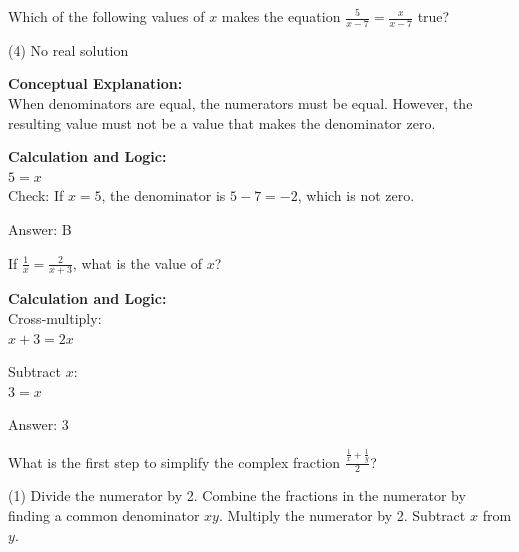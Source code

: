 \documentclass[11pt,paper=a4,answers]{exam}
\begin{document}
\begin{questions}
\vspace{40pt}

\question
Which of the following values of $x$ makes the equation $\frac{5}{x-7} = \frac{x}{x-7}$ true?
\begin{tasks}(4)
    \task No real solution
\end{tasks}

\begin{solution}
\textbf{Conceptual Explanation:} \\
When denominators are equal, the numerators must be equal. However, the resulting value must not be a value that makes the denominator zero.

\vspace{20pt}

\textbf{Calculation and Logic:} \\
$5 = x$ \\
Check: If $x=5$, the denominator is $5-7=-2$, which is not zero.

\vspace{25pt}

Answer: \colorbox{yellow!100}{B}
\end{solution}

\vspace{40pt}

\question
If $\frac{1}{x} = \frac{2}{x+3}$, what is the value of $x$?

\begin{solution}
\textbf{Calculation and Logic:} \\
Cross-multiply: \\
$x + 3 = 2x$

\vspace{10pt}

Subtract $x$: \\
$3 = x$

\vspace{25pt}

Answer: \colorbox{yellow!100}{3}
\end{solution}

\vspace{40pt}

\question
What is the first step to simplify the complex fraction $\frac{\frac{1}{x} + \frac{1}{y}}{2}$?
\begin{tasks}(1)
    \task Divide the numerator by 2.
    \task Combine the fractions in the numerator by finding a common denominator $xy$.
    \task Multiply the numerator by 2.
    \task Subtract $x$ from $y$.
\end{tasks}


\end{questions}
\end{document}
